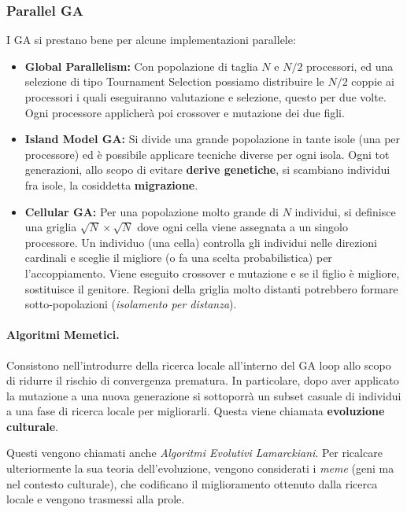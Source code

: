         \subsubsection{Parallel GA}
            I GA si prestano bene per alcune implementazioni parallele:
            \begin{itemize}
                \item \textbf{Global Parallelism:} Con popolazione di taglia $N$ e $N/2$ processori, ed una selezione di tipo Tournament Selection possiamo distribuire le $N/2$ coppie ai processori i quali eseguiranno valutazione e selezione, questo per due volte. Ogni processore applicherà poi crossover e mutazione dei due figli.
                
                \item \textbf{Island Model GA:} Si divide una grande popolazione in tante isole (una per processore) ed è possibile applicare tecniche diverse per ogni isola. Ogni tot generazioni, allo scopo di evitare \textbf{derive genetiche}, si scambiano individui fra isole, la cosiddetta \textbf{migrazione}.
                
                \item \textbf{Cellular GA:} Per una popolazione molto grande di $N$ individui, si definisce una griglia $\sqrt{N} \times \sqrt{N}$ dove ogni cella viene assegnata a un singolo processore. Un individuo (una cella) controlla gli individui nelle direzioni cardinali e sceglie il migliore (o fa una scelta probabilistica) per l'accoppiamento. Viene eseguito crossover e mutazione e se il figlio è migliore, sostituisce il genitore. Regioni della griglia molto distanti potrebbero formare sotto-popolazioni (\textit{isolamento per distanza}).
            \end{itemize}
            
            \paragraph{Algoritmi Memetici.} Consistono nell'introdurre della ricerca locale all'interno del GA loop allo scopo di ridurre il rischio di convergenza prematura. In particolare, dopo aver applicato la mutazione a una nuova generazione si sottoporrà un subset casuale di individui a una fase di ricerca locale per migliorarli. Questa viene chiamata \textbf{evoluzione culturale}.
            
            Questi vengono chiamati anche \textit{Algoritmi Evolutivi Lamarckiani}. Per ricalcare ulteriormente la sua teoria dell'evoluzione, vengono considerati i \textit{meme} (geni ma nel contesto culturale), che codificano il miglioramento ottenuto dalla ricerca locale e vengono trasmessi alla prole.
         
